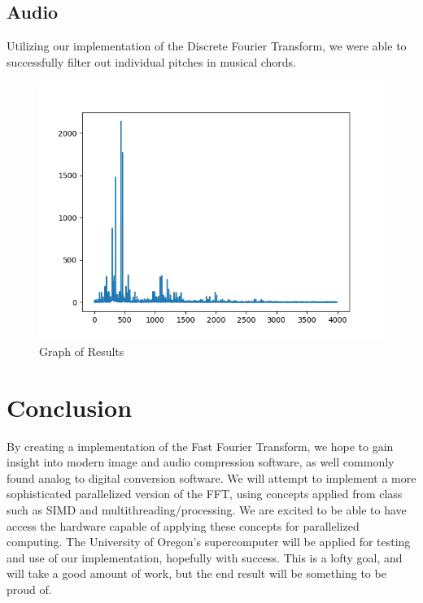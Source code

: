 \documentclass[12pt]{extarticle}
\begin{document}
\subsection*{Audio}
Utilizing our implementation of the Discrete Fourier Transform, we were able to successfully filter out individual pitches in musical
chords.

\begin{figure}[h]
  \includegraphics[scale=0.75]{./images/pitchgraph.png}
  \caption{Graph of Results}
\end{figure}

\section*{Conclusion}
	By creating a implementation of the Fast Fourier Transform, we hope to gain insight into modern image and audio compression software, as well commonly found analog to digital conversion software.
    We will attempt to implement a more sophisticated parallelized version of the FFT, using concepts applied from class such as SIMD and multithreading/processing.
    We are excited to be able to have access the hardware capable of applying these concepts for parallelized computing.
	The University of Oregon's supercomputer will be applied for testing and use of our implementation, hopefully with success. 
	This is a lofty goal, and will take a good amount of work, but the end result will be something to be proud of.


\end{document}
